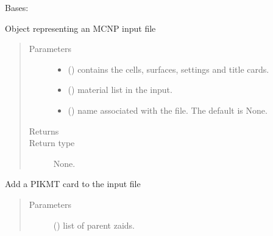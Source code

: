\documentclass[letterpaper,10pt,english]{sphinxmanual}
\begin{document}
\begin{fulllineitems}
\label{\detokenize{api/inputgeneration:inputfile.D1S_Input}}
Bases: {\hyperref[\detokenize{api/inputgeneration:inputfile.InputFile}]{}}

Object representing an MCNP input file
\begin{quote}\begin{description}
\item[{Parameters}] \leavevmode\begin{itemize}
\item {} 
 () \textendash{} contains the cells, surfaces, settings and title cards.

\item {} 
 () \textendash{} material list in the input.

\item {} 
 (\sphinxstyleliteralemphasis{\sphinxupquote{, }}) \textendash{} name associated with the file. The default is None.

\end{itemize}

\item[{Returns}] \leavevmode


\item[{Return type}] \leavevmode
None.

\end{description}\end{quote}

\begin{fulllineitems}
\label{\detokenize{api/inputgeneration:inputfile.D1S_Input.add_PIKMT_card}}
Add a PIKMT card to the input file
\begin{quote}\begin{description}
\item[{Parameters}] \leavevmode
{} () \textendash{} list of parent zaids.


\end{description}
\end{quote}
\end{fulllineitems}
\end{fulllineitems}
\end{document}
